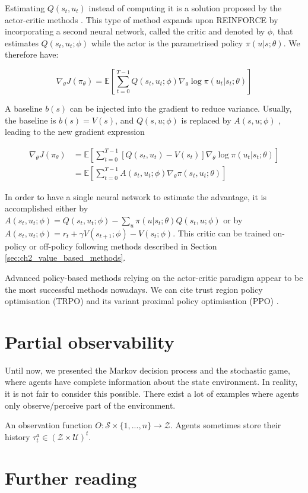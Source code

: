 Estimating $Q(s_t, u_t)$ instead of computing it is a solution proposed by the actor-critic methods \citep{sutton1999policy,konda1999actor}.
This type of method expands upon REINFORCE by incorporating a second neural network, called the critic and denoted by $\phi$, that estimates $Q(s_t, u_t;\phi)$ while the actor is the parametrised policy $\pi(u|s;\theta)$.
We therefore have:

\begin{equation}
\label{eq:ch2_Q_actor_crit}
    \nabla_\theta J(\pi_\theta) = \mathbb{E}\left[\sum_{t=0}^{T-1} Q(s_t, u_t;\phi) \nabla_\theta \log \pi(u_t|s_t;\theta)\right]
\end{equation}

A baseline $b(s)$ can be injected into the gradient to reduce variance.
Usually, the baseline is  $b(s) = V(s)$, and $Q(s, u;\phi)$ is replaced by $A(s,u; \phi)$ \citep{10.5555/2074022.2074088}, leading to the new gradient expression

\begin{align}
\label{eq:ch2_baseline_actor_crit}
    \nabla_\theta J(\pi_\theta)
    & = \mathbb{E}\left[\sum_{t=0}^{T-1} [Q(s_t, u_t) - V(s_t)] \nabla_\theta \log \pi(u_t|s_t;\theta)\right]\\
    & = \mathbb{E} \left[\sum_{t=0}^{T-1} A(s_t, u_t; \phi) \nabla_\theta \pi(s_t, u_t; \theta)\right]
\end{align}

In order to have a single neural network to estimate the advantage, it is accomplished either by $A(s_t,u_t; \phi)=Q(s_t, u_t;\phi)-\sum_u \pi(u|s_t;\theta) Q(s_t,u; \phi)$ or by $A(s_t,u_t; \phi)=r_t +\gamma V(s_{t+1};\phi) - V(s_t;\phi)$.
This critic can be trained on-policy or off-policy following methods described in Section \ref{sec:ch2_value_based_methods}.

Advanced policy-based methods relying on the actor-critic paradigm appear to be the most successful methods nowadays.
We can cite trust region policy optimisation (TRPO) \citep{schulman2015trust} and its variant proximal policy optimisation (PPO) \citep{schulman2017ppo}.

\section{Partial observability} \label{sec:ch2_partial_observability}
Until now, we presented the Markov decision process and the stochastic game, where agents have complete information about the state environment.
In reality, it is not fair to consider this possible.
There exist a lot of examples where agents only observe/perceive part of the environment.


An observation function $O:\mathcal{S} \times \{1,...,n\} \rightarrow \mathcal{Z}$.
Agents sometimes store their history $\tau^a_t \in (\mathcal{Z} \times \mathcal{U})^t$.

\section{Further reading} \label{sec:ch2_futher}
